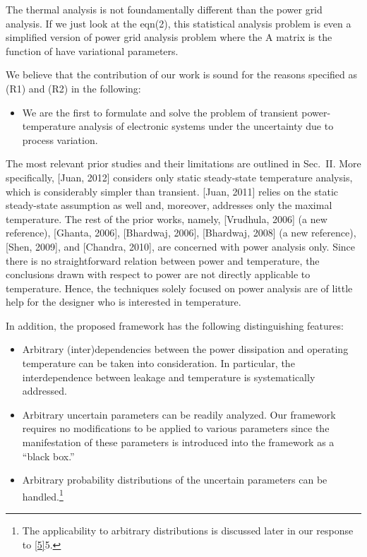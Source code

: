\begin{reviewer}
The thermal analysis is not foundamentally different than the power grid analysis.  If we just look at the eqn(2), this statistical analysis problem is even a simplified version of power grid analysis problem where the A matrix is the function of have variational parameters.
\end{reviewer}
\begin{authors}
We believe that the contribution of our work is sound for the reasons specified as (R1) and (R2) in the following:
\begin{itemize}
  \item[(R1)] We are the first to formulate and solve the problem of transient power-temperature analysis of electronic systems under the uncertainty due to process variation.
\end{itemize}
The most relevant prior studies and their limitations are outlined in Sec.~II.
More specifically, [Juan, 2012] considers only static steady-state temperature analysis, which is considerably simpler than transient.
[Juan, 2011] relies on the static steady-state assumption as well and, moreover, addresses only the maximal temperature.
The rest of the prior works, namely, [Vrudhula, 2006] (a new reference), [Ghanta, 2006], [Bhardwaj, 2006], [Bhardwaj, 2008] (a new reference), [Shen, 2009], and [Chandra, 2010], are concerned with power analysis only.
Since there is no straightforward relation between power and temperature, the conclusions drawn with respect to power are not directly applicable to temperature.
Hence, the techniques solely focused on power analysis are of little help for the designer who is interested in temperature.

In addition, the proposed framework has the following distinguishing features:
\begin{itemize}
  \item[1.] Arbitrary (inter)dependencies between the power dissipation and operating temperature can be taken into consideration.
  In particular, the interdependence between leakage and temperature is systematically addressed.

  \item[2.] Arbitrary uncertain parameters can be readily analyzed.
  Our framework requires no modifications to be applied to various parameters since the manifestation of these parameters is introduced into the framework as a ``black box.''

  \item[3.] Arbitrary probability distributions of the uncertain parameters can be handled.\footnote{The applicability to arbitrary distributions is discussed later in our response to \cref{5}{5}.}


\end{itemize}
\end{authors}
